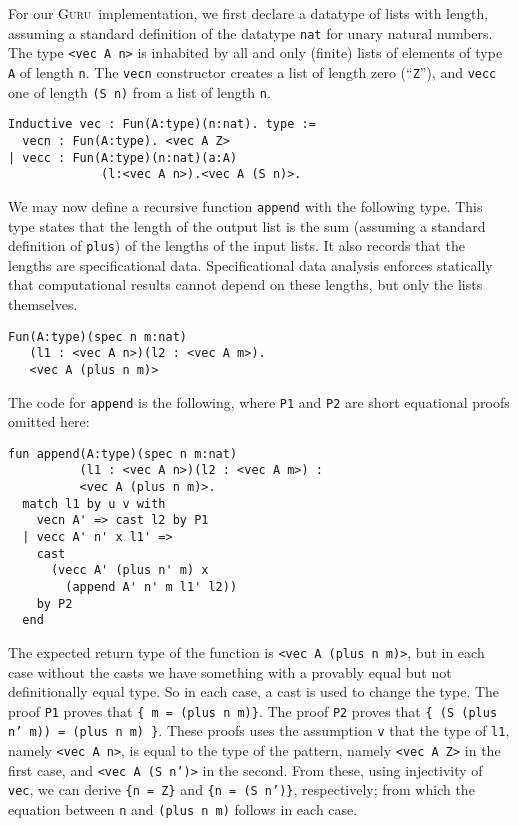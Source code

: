 \documentclass[preprint,natbib]{sigplanconf}
\newcommand{\guru}[0]{\textsc{Guru}}
\begin{document}
For our \guru\ implementation, we first declare a datatype of lists
with length, assuming a standard definition of the datatype
\texttt{nat} for unary natural numbers.  The type \texttt{<vec A n>}
is inhabited by all and only (finite) lists of elements of type
\texttt{A} of length \texttt{n}.  The \texttt{vecn} constructor
creates a list of length zero (``\texttt{Z}''), and \texttt{vecc} one
of length \texttt{(S n)} from a list of length \texttt{n}.

\begin{verbatim}
Inductive vec : Fun(A:type)(n:nat). type :=
  vecn : Fun(A:type). <vec A Z>
| vecc : Fun(A:type)(n:nat)(a:A)
             (l:<vec A n>).<vec A (S n)>.
\end{verbatim}

\noindent
We may now define a recursive function \texttt{append} with the
following type.  This type states that the length of the output list
is the sum (assuming a standard definition of \texttt{plus}) of the
lengths of the input lists.  It also records that the lengths are
specificational data.  Specificational data analysis enforces
statically that computational results cannot depend on these
lengths, but only the lists themselves.

\begin{verbatim}
Fun(A:type)(spec n m:nat)
   (l1 : <vec A n>)(l2 : <vec A m>).
   <vec A (plus n m)> 
\end{verbatim}


\noindent The code for \texttt{append} is the following, where
\texttt{P1} and \texttt{P2} are short equational proofs omitted here:

\begin{verbatim}
fun append(A:type)(spec n m:nat)
          (l1 : <vec A n>)(l2 : <vec A m>) :
          <vec A (plus n m)>.
  match l1 by u v with
    vecn A' => cast l2 by P1
  | vecc A' n' x l1' => 
    cast
      (vecc A' (plus n' m) x 
        (append A' n' m l1' l2)) 
    by P2
  end
\end{verbatim}
             
\noindent The expected return type of the function is \texttt{<vec A
(plus n m)>}, but in each case without the casts we have something
with a provably equal but not definitionally equal type.  So in each
case, a cast is used to change the type.  The proof \texttt{P1} proves
that \texttt{\{ m = (plus n m)\}}.  The proof \texttt{P2} proves that
\texttt{\{ (S (plus n' m)) = (plus n m) \}}.  These proofs uses the
assumption \texttt{v} that the type of \texttt{l1}, namely
\texttt{<vec A n>}, is equal to the type of the pattern, namely
\texttt{<vec A Z>} in the first case, and \texttt{<vec A (S n')>} in
the second.  From these, using injectivity of \texttt{vec}, we can
derive \texttt{\{n = Z\}} and \texttt{\{n = (S n')\}}, respectively;
from which the equation between \texttt{n} and \texttt{(plus n m)}
follows in each case.
\end{document}

